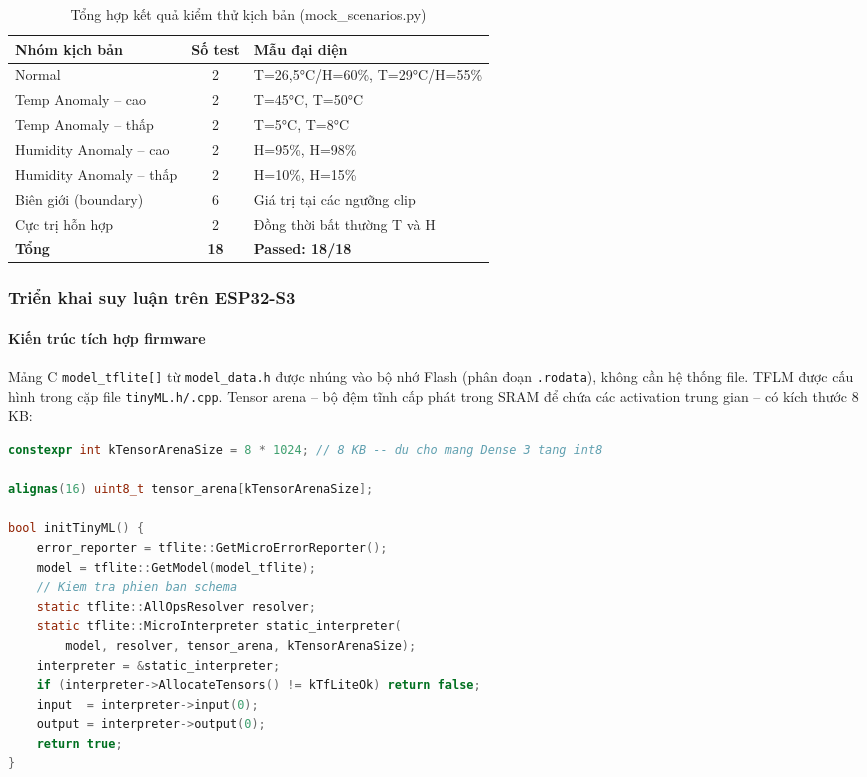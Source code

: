 \begin{table}[h!]
\centering
\caption{Tổng hợp kết quả kiểm thử kịch bản (mock\_scenarios.py)}
\label{tab:task5-scenarios}
\begin{tabular}{|l|c|p{5.5cm}|}
\hline
\textbf{Nhóm kịch bản} & \textbf{Số test} & \textbf{Mẫu đại diện} \\
\hline
Normal & 2 & T=26,5°C/H=60\%, T=29°C/H=55\% \\
Temp Anomaly -- cao & 2 & T=45°C, T=50°C \\
Temp Anomaly -- thấp & 2 & T=5°C, T=8°C \\
Humidity Anomaly -- cao & 2 & H=95\%, H=98\% \\
Humidity Anomaly -- thấp & 2 & H=10\%, H=15\% \\
Biên giới (boundary) & 6 & Giá trị tại các ngưỡng clip \\
Cực trị hỗn hợp & 2 & Đồng thời bất thường T và H \\
\hline
\textbf{Tổng} & \textbf{18} & \textbf{Passed: 18/18} \\
\hline
\end{tabular}
\end{table}

\subsubsection*{Triển khai suy luận trên ESP32-S3}

\paragraph{Kiến trúc tích hợp firmware}
Mảng C \texttt{model\_tflite[]} từ \texttt{model\_data.h} được nhúng vào bộ nhớ Flash (phân đoạn \texttt{.rodata}), không cần hệ thống file. TFLM được cấu hình trong cặp file \texttt{tinyML.h/.cpp}. Tensor arena -- bộ đệm tĩnh cấp phát trong SRAM để chứa các activation trung gian -- có kích thước 8\,KB:

\begin{lstlisting}[language=c, caption=Khai báo tensor arena và khởi tạo TFLM (trích tinyML.cpp)]
constexpr int kTensorArenaSize = 8 * 1024; // 8 KB -- du cho mang Dense 3 tang int8

alignas(16) uint8_t tensor_arena[kTensorArenaSize];

bool initTinyML() {
    error_reporter = tflite::GetMicroErrorReporter();
    model = tflite::GetModel(model_tflite);
    // Kiem tra phien ban schema
    static tflite::AllOpsResolver resolver;
    static tflite::MicroInterpreter static_interpreter(
        model, resolver, tensor_arena, kTensorArenaSize);
    interpreter = &static_interpreter;
    if (interpreter->AllocateTensors() != kTfLiteOk) return false;
    input  = interpreter->input(0);
    output = interpreter->output(0);
    return true;
}
\end{lstlisting}

